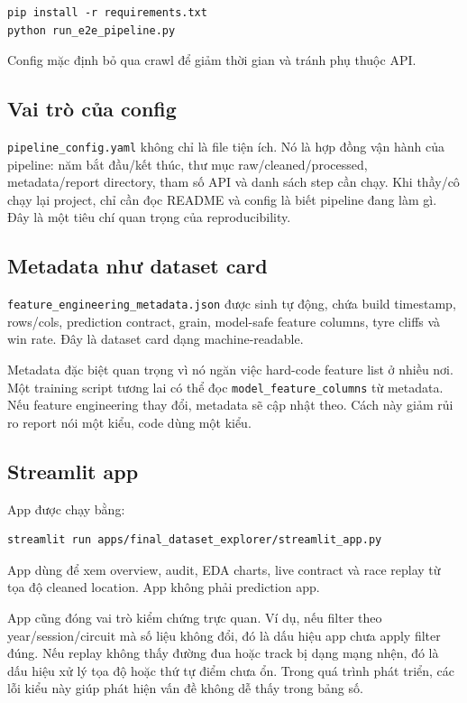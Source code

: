 \documentclass[conference]{IEEEtran}
\begin{document}
\begin{lstlisting}
pip install -r requirements.txt
python run_e2e_pipeline.py
\end{lstlisting}

Config mặc định bỏ qua crawl để giảm thời gian và tránh phụ thuộc API.

\subsection{Vai trò của config}
\texttt{pipeline\_config.yaml} không chỉ là file tiện ích. Nó là hợp đồng vận hành của pipeline: năm bắt đầu/kết thúc, thư mục raw/cleaned/processed, metadata/report directory, tham số API và danh sách step cần chạy. Khi thầy/cô chạy lại project, chỉ cần đọc README và config là biết pipeline đang làm gì. Đây là một tiêu chí quan trọng của reproducibility.

\subsection{Metadata như dataset card}
\texttt{feature\_engineering\_metadata.json} được sinh tự động, chứa build timestamp, rows/cols, prediction contract, grain, model-safe feature columns, tyre cliffs và win rate. Đây là dataset card dạng machine-readable.

Metadata đặc biệt quan trọng vì nó ngăn việc hard-code feature list ở nhiều nơi. Một training script tương lai có thể đọc \texttt{model\_feature\_columns} từ metadata. Nếu feature engineering thay đổi, metadata sẽ cập nhật theo. Cách này giảm rủi ro report nói một kiểu, code dùng một kiểu.

\subsection{Streamlit app}
App được chạy bằng:

\begin{lstlisting}
streamlit run apps/final_dataset_explorer/streamlit_app.py
\end{lstlisting}

App dùng để xem overview, audit, EDA charts, live contract và race replay từ tọa độ cleaned location. App không phải prediction app.

App cũng đóng vai trò kiểm chứng trực quan. Ví dụ, nếu filter theo year/session/circuit mà số liệu không đổi, đó là dấu hiệu app chưa apply filter đúng. Nếu replay không thấy đường đua hoặc track bị dạng mạng nhện, đó là dấu hiệu xử lý tọa độ hoặc thứ tự điểm chưa ổn. Trong quá trình phát triển, các lỗi kiểu này giúp phát hiện vấn đề không dễ thấy trong bảng số.
\end{document}
